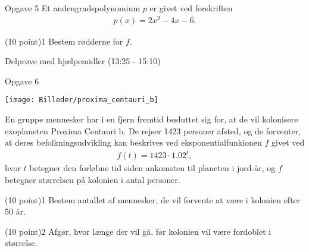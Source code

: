 \begin{opgavetekst}{Opgave 5}
	Et andengradspolynomium $p$ er givet ved forskriften
	\begin{align*}
		p(x) = 2x^2 - 4x - 6.
	\end{align*}
\end{opgavetekst}
\begin{delopgave}{(10 point)}{1}
	Bestem rødderne for $f$. 
\end{delopgave}


\newpage
\begin{center}
	\LARGE Delprøve med hjælpemidler (13:25 - 15:10)
\end{center}

\begin{opgavetekst}{Opgave 6}
	\begin{center}
		\texttt{[image: Billeder/proxima\_centauri\_b]}
	\end{center}
	En gruppe mennesker har i en fjern fremtid besluttet sig for, at de vil kolonisere exoplaneten Proxima Centauri b. De rejser 1423 personer afsted, og de forventer, at 
	deres befolkningsudvikling kan beskrives ved eksponentialfunkionen $f$ givet ved
	\begin{align*}
		f(t) = 1423 \cdot 1.02^t,
	\end{align*}
	hvor $t$ betegner den forløbne tid siden ankomsten til planeten i jord-år, og $f$ betegner størrelsen på kolonien i antal personer. 
\end{opgavetekst}
\begin{delopgave}{(10 point)}{1}
	Bestem antallet af mennesker, de vil forvente at være i kolonien efter 50 år.
\end{delopgave}
\begin{delopgave}{(10 point)}{2}
	Afgør, hvor længe der vil gå, før kolonien vil være fordoblet i størrelse.
\end{delopgave}

